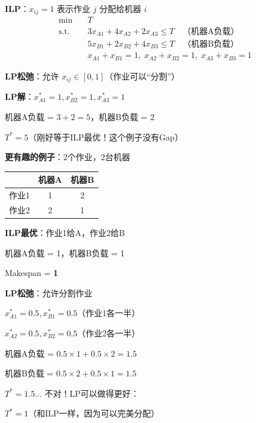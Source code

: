 \documentclass[12pt, a4paper]{ctexart}
\begin{document}
\begin{blackboard}

\textbf{ILP}：$x_{ij} = 1$ 表示作业 $j$ 分配给机器 $i$
\begin{align*}
\min \quad & T \\
\text{s.t.} \quad & 3x_{A1} + 4x_{A2} + 2x_{A3} \leq T \quad \text{（机器A负载）} \\
& 5x_{B1} + 2x_{B2} + 4x_{B3} \leq T \quad \text{（机器B负载）} \\
& x_{A1} + x_{B1} = 1, \; x_{A2} + x_{B2} = 1, \; x_{A3} + x_{B3} = 1
\end{align*}

\textbf{LP松弛}：允许 $x_{ij} \in [0,1]$（作业可以``分割''）

\textbf{LP解}：$x_{A1}^* = 1, x_{B2}^* = 1, x_{A3}^* = 1$

机器A负载 = $3 + 2 = 5$，机器B负载 = 2

$T^* = 5$（刚好等于ILP最优！这个例子没有Gap）

\end{blackboard}

\begin{blackboard}

\textbf{更有趣的例子}：2个作业，2台机器

\begin{center}
\begin{tabular}{c|c|c}
& 机器A & 机器B \\
\hline
作业1 & 1 & 2 \\
作业2 & 2 & 1
\end{tabular}
\end{center}

\textbf{ILP最优}：作业1给A，作业2给B

机器A负载 = 1，机器B负载 = 1

Makespan = \textbf{1}

\textbf{LP松弛}：允许分割作业

$x_{A1}^* = 0.5, x_{B1}^* = 0.5$（作业1各一半）

$x_{A2}^* = 0.5, x_{B2}^* = 0.5$（作业2各一半）

机器A负载 = $0.5 \times 1 + 0.5 \times 2 = 1.5$

机器B负载 = $0.5 \times 2 + 0.5 \times 1 = 1.5$

$T^* = 1.5$... 不对！LP可以做得更好：

$T^* = 1$（和ILP一样，因为可以完美分配）

\end{blackboard}
\end{document}
